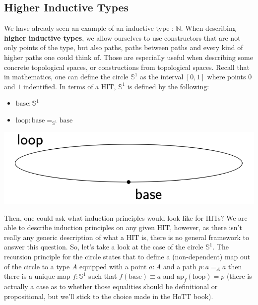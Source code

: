 \documentclass{report}
\begin{document}
\subsection{Higher Inductive Types}
We have already seen an example of an inductive type : $\mathbb N$. When describing \textbf{higher inductive types}, we allow ourselves to use constructors that are not only points of the type, but also paths, paths between paths and every kind of higher paths one could think of. Those are especially useful when describing some concrete topological spaces, or constructions from topological spaces. Recall that in mathematics, one can define the circle $\mathbb{S}^1$ as the interval $[0,1]$ where points $0$ and $1$ indentified. In terms of a HIT, $\mathbb{S}^1$ is defined by the following: \\
\begin{minipage}{.5\linewidth}
  \begin{itemize}
    \item $\mathrm{base} : \mathbb{S}^1$
    \item $\mathrm{loop} : \mathrm{base} =_{\mathbb{S}^1} \mathrm{base}$
  \end{itemize}
\end{minipage}
\hfill
\begin{minipage}{.5\linewidth}
  \centering
  \includegraphics[width=.75\linewidth]{images/circle.png}
\end{minipage}
Then, one could ask what induction principles would look like for HITs? We are able to describe induction principles on any given HIT, however, as there isn't really any generic description of what a HIT is, there is no general framework to answer this question. So, let's take a look at the case of the circle $\mathbb{S}^1$. The recursion principle for the circle states that to define a (non-dependent) map out of the circle to a type $A$ equipped with a point $a :A$ and a path $ p : a=_A a$ then there is a unique map $f : \mathbb{S}^1$ such that $f(\mathrm{base}) \equiv a$ and $\mathrm{ap}_f(\mathrm{loop}) =p$ (there is actually a case as to whether those equalities should be definitional or propositional, but we'll stick to the choice made in the HoTT book).\\
\end{document}
